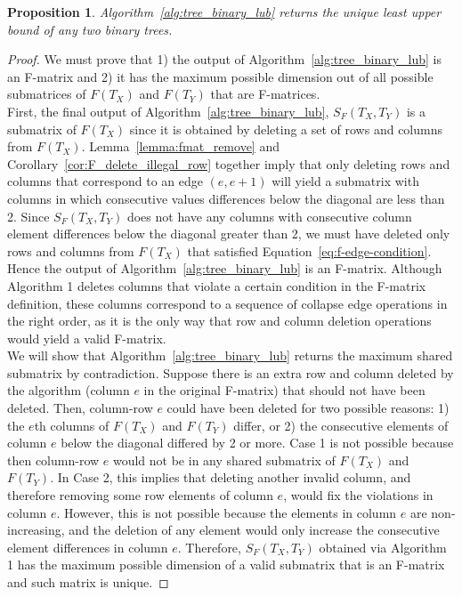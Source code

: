 \documentclass{article}
\newtheorem{proposition}[theorem]{Proposition}
\begin{document}
\begin{proposition}\label{prop:binary-lub}
Algorithm~\ref{alg:tree_binary_lub} returns the unique least upper bound of any two binary trees. 
\end{proposition}
\begin{proof}
We must prove that 1) the output of Algorithm~\ref{alg:tree_binary_lub} is an F-matrix and 2) it has the maximum possible dimension out of all possible submatrices of $F(T_X)$ and $F(T_Y)$ that are F-matrices. \\

\noindent First, the final output of Algorithm~\ref{alg:tree_binary_lub}, $S_F(T_X, T_Y)$ is a submatrix of $F(T_X)$ since it is obtained by deleting a set of rows and columns from $F(T_X)$. Lemma~\ref{lemma:fmat_remove} and Corollary~\ref{cor:F_delete_illegal_row} together imply that only deleting rows and columns that correspond to an edge $(e, e+1)$ will yield a submatrix with columns in which consecutive values differences below the diagonal are less than 2. Since $S_F(T_X, T_Y)$ does not have any columns with consecutive column element differences below the diagonal greater than 2, we must have deleted only rows and columns from $F(T_X)$ that satisfied Equation~\ref{eq:f-edge-condition}. Hence the output of Algorithm~\ref{alg:tree_binary_lub} is an F-matrix. Although Algorithm 1 deletes columns that violate a certain condition in the F-matrix definition, these columns correspond to a sequence of collapse edge operations in the right order, as it is the only way that row and column deletion operations would yield a valid F-matrix.\\ 

\noindent We will show that Algorithm~\ref{alg:tree_binary_lub} returns the maximum shared submatrix by contradiction. Suppose there is an extra row and column deleted by the algorithm (column $e$ in the original F-matrix) that should not have been deleted. Then, column-row $e$ could have been deleted for two possible reasons: 1) the $e$th columns of $F(T_X)$ and $F(T_Y)$ differ, or 2) the consecutive elements of column $e$ below the diagonal differed by 2 or more. Case 1 is not possible because then column-row $e$ would not be in any shared submatrix of $F(T_X)$ and  $F(T_Y)$. In Case 2, this implies that deleting another invalid column, and therefore removing some row elements of column $e$, would fix the violations in column $e$. However, this is not possible because the elements in column $e$ are non-increasing, and the deletion of any element would only increase the consecutive element differences in column $e$. Therefore, $S_F(T_X, T_Y)$ obtained via Algorithm 1 has the maximum possible dimension of a valid submatrix that is an F-matrix and such matrix is unique.
\end{proof}
\end{document}
